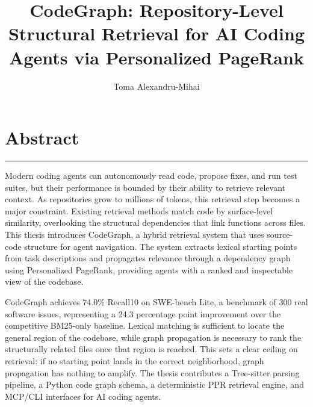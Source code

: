 \documentclass[12pt]{report}
\begin{document}
\title{CodeGraph: Repository-Level Structural Retrieval for AI Coding Agents via Personalized PageRank}
\author{Toma Alexandru-Mihai}

\hypersetup{pageanchor=false}
\maketitle
\maketitlero
\hypersetup{pageanchor=true}


\cleardoublepage
{}

\cleardoublepage
\chapter*{Abstract}
\vspace{0.5cm}
\hrule
\vspace{0.5cm}

Modern coding agents can autonomously read code, propose fixes, and run test suites, but their performance is bounded by their ability to retrieve relevant context. As repositories grow to millions of tokens, this retrieval step becomes a major constraint. Existing retrieval methods match code by surface-level similarity, overlooking the structural dependencies that link functions across files. This thesis introduces CodeGraph, a hybrid retrieval system that uses source-code structure for agent navigation. The system extracts lexical starting points from task descriptions and propagates relevance through a dependency graph using Personalized PageRank, providing agents with a ranked and inspectable view of the codebase.

CodeGraph achieves 74.0\% Recall\@10 on SWE-bench Lite, a benchmark of 300 real software issues, representing a 24.3 percentage point improvement over the competitive BM25-only baseline. Lexical matching is sufficient to locate the general region of the codebase, while graph propagation is necessary to rank the structurally related files once that region is reached. This sets a clear ceiling on retrieval: if no starting point lands in the correct neighborhood, graph propagation has nothing to amplify. The thesis contributes a Tree-sitter parsing pipeline, a Python code graph schema, a deterministic PPR retrieval engine, and MCP/CLI interfaces for AI coding agents.

\tableofcontents


\newpage
{}
















\end{document}
